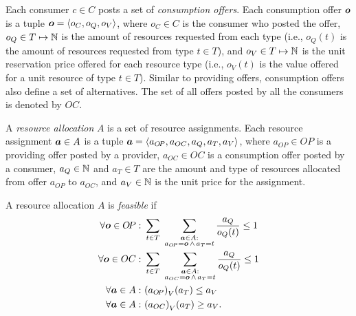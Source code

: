 Each consumer $c \in C$ posts a set of \emph{consumption offers}. %
Each consumption offer $\boldsymbol{o}$ %
is a tuple $\boldsymbol{o} = \langle o_C, o_Q, o_V \rangle$, where $o_C \in C$ is the consumer who posted the offer, $o_Q \in T \mapsto \mathbb{N}$ is the amount of resources requested from each type (i.e., $o_Q(t)$ is the amount of resources requested from type $t \in T$), and $o_V \in T \mapsto \mathbb{N}$ is the unit reservation price offered for each resource type (i.e., $o_V(t)$ is the value offered for a unit resource of type $t \in T$).
Similar to providing offers, consumption offers also define a set of alternatives.
The set of all offers posted by all the consumers is denoted by $OC$. %

A \emph{resource allocation} $A$ is a set of resource assignments.
Each resource assignment $\boldsymbol{a} \in A$ is a tuple $\boldsymbol{a} = \langle a_{O\!P}, a_{OC}, a_Q, a_T, a_V \rangle$, where $a_{O\!P} \in O\!P$ is a providing offer posted by a provider, $a_{OC} \in OC$ is a consumption offer posted by a consumer, $a_Q \in \mathbb{N}$ and $a_T \in T$ are the amount and type of resources allocated from offer $a_{O\!P}$ to $a_{OC}$, and $a_V \in \mathbb{N}$ is the unit price for the assignment.

A resource allocation $A$ is \emph{feasible} if
\begin{align}
\forall \vo \in O\!P: ~ & \sum_{t \in T} ~ \sum_{\substack{\va \in A:\\a_{O\!P} = \vo \,\wedge\, a_T = t}} \frac{a_Q}{o_Q(t)} \leq 1 \label{eq:feasable1} \\
\forall \vo \in OC: ~ & \sum_{t \in T} ~ \sum_{\substack{\va \in A:\\a_{OC} = \vo \,\wedge\, a_T = t}} \frac{a_Q}{o_Q(t)} \leq 1 \\
\forall \va \in A: ~ & {\left(a_{O\!P}\right)}_V(a_T) \leq a_V \\
\forall \va \in A: ~ & {\left(a_{OC}\right)}_V(a_T) \geq a_V \label{eq:feasable4} .
\end{align}

